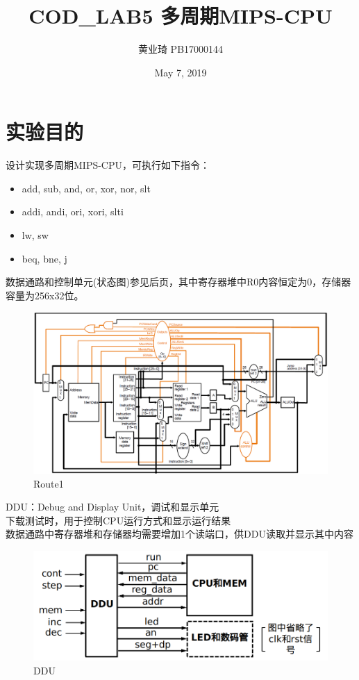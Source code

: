 \documentclass[12pt, a4paper]{article}
\title{COD\_LAB5 多周期MIPS-CPU}
\author{黄业琦 PB17000144}
\date{May 7, 2019}
\begin{document}
\maketitle
\tableofcontents
\clearpage

\section{实验目的}
设计实现多周期MIPS-CPU，可执行如下指令：
\begin{itemize}
\item add, sub, and, or, xor, nor, slt
\item addi, andi, ori, xori, slti
\item lw, sw
\item beq, bne, j
\end{itemize}
数据通路和控制单元(状态图)参见后页，其中寄存器堆中R0内容恒定为0，存储器容量为256x32位。
\begin{figure}[H]
	\centering
	\includegraphics[width=1\linewidth]{pics/Picture1}
	\caption{Route1}
	\label{fig:picture1}
\end{figure}
DDU：Debug and Display Unit，调试和显示单元 \\
下载测试时，用于控制CPU运行方式和显示运行结果 \\
数据通路中寄存器堆和存储器均需要增加1个读端口，供DDU读取并显示其中内容 \\
\begin{figure}[H]
	\centering
	\includegraphics[width=1\linewidth]{pics/pc}
	\caption{DDU}
	\label{fig:pc}
\end{figure}
\end{document}
